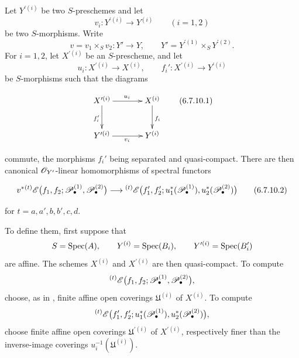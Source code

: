 \begin{env}[6.7.10]
\label{III.6.7.10}
Let $Y^{\prime(i)}$ be two $S$-preschemes and let
\[
  v_i:Y^{\prime(i)}\longrightarrow Y^{(i)}
  \qquad (i=1,2)
\]
be two $S$-morphisms.  Write
\[
  v=v_1\times_Sv_2:Y'\longrightarrow Y,
  \qquad
  Y'=Y^{\prime(1)}\times_SY^{\prime(2)}.
\]
For $i=1,2$, let $X^{\prime(i)}$ be an $S$-prescheme, and let
\[
  u_i:X^{\prime(i)}\longrightarrow X^{(i)},
  \qquad
  f_i':X^{\prime(i)}\longrightarrow Y^{\prime(i)}
\]
be $S$-morphisms such that the diagrams
\begin{env}[6.7.10.1]
\label{III.6.7.10.1}
\[
\xymatrix@C=36pt@R=28pt{
  X^{\prime(i)} \ar[r]^{u_i}\ar[d]_{f_i'}
  & X^{(i)}\ar[d]^{f_i}
  \\
  Y^{\prime(i)} \ar[r]_{v_i}
  & Y^{(i)}
}
\tag{6.7.10.1}\label{III.6.7.10.1.eq}
\]
\end{env}
commute, the morphisms $f_i'$ being separated and quasi-compact.
There are then canonical $\mathscr{O}_{Y'}$-linear homomorphisms of
spectral functors
\begin{env}[6.7.10.2]
\label{III.6.7.10.2}
\[
  v^*
  {}^{(t)}\mathscr{E}
  \bigl(
    f_1,f_2;
    \mathscr{P}_\bullet^{(1)},\mathscr{P}_\bullet^{(2)}
  \bigr)
  \longrightarrow
  {}^{(t)}\mathscr{E}
  \bigl(
    f_1',f_2';
    u_1^*(\mathscr{P}_\bullet^{(1)}),
    u_2^*(\mathscr{P}_\bullet^{(2)})
  \bigr)
  \tag{6.7.10.2}\label{III.6.7.10.2.eq}
\]
\end{env}
for $t=a,a',b,b',c,d$.

To define them, first suppose that
\[
  S=\operatorname{Spec}(A),\qquad
  Y^{(i)}=\operatorname{Spec}(B_i),\qquad
  Y^{\prime(i)}=\operatorname{Spec}(B_i')
\]
are affine.  The schemes $X^{(i)}$ and $X^{\prime(i)}$ are then
quasi-compact.  To compute
\[
  {}^{(t)}\mathscr{E}
  \bigl(
    f_1,f_2;
    \mathscr{P}_\bullet^{(1)},\mathscr{P}_\bullet^{(2)}
  \bigr),
\]
choose, as in , finite affine open coverings
$\mathfrak U^{(i)}$ of $X^{(i)}$.  To compute
\[
  {}^{(t)}\mathscr{E}
  \bigl(
    f_1',f_2';
    u_1^*(\mathscr{P}_\bullet^{(1)}),
    u_2^*(\mathscr{P}_\bullet^{(2)})
  \bigr),
\]
choose finite affine open coverings $\mathfrak U^{\prime(i)}$ of
$X^{\prime(i)}$, respectively finer than the inverse-image
coverings $u_i^{-1}(\mathfrak U^{(i)})$.



\end{env}
